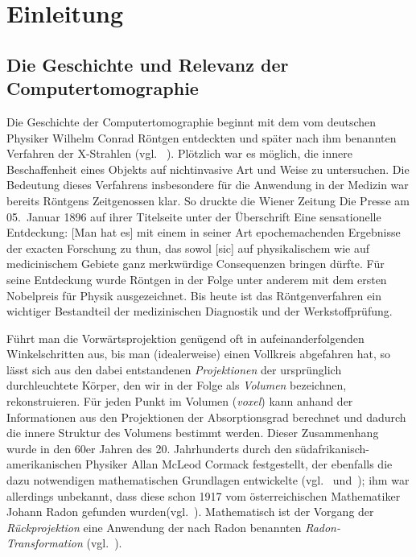 \chapter{Einleitung}

\section{Die Geschichte und Relevanz der Computertomographie}

Die Geschichte der Computertomographie beginnt mit dem vom deutschen Physiker Wilhelm Conrad Röntgen entdeckten
und später nach ihm benannten Verfahren der {\glqq}X-Strahlen{\grqq} (vgl. ~\cite{roentgen}). Plötzlich war es möglich,
die innere Beschaffenheit eines Objekts auf nichtinvasive Art und Weise zu untersuchen. Die Bedeutung dieses Verfahrens
insbesondere für die Anwendung in der Medizin war bereits Röntgens Zeitgenossen klar. So druckte die Wiener Zeitung
{\glqq}Die Presse{\grqq} am 05.\ Januar 1896 auf ihrer Titelseite unter der Überschrift {\glqq}Eine sensationelle
Entdeckung{\grqq}: {\glqq}[Man hat es] mit einem in seiner Art epochemachenden Ergebnisse der exacten Forschung zu thun,
das sowol [sic] auf physikalischem wie auf medicinischem Gebiete ganz merkwürdige Consequenzen bringen dürfte.{\grqq}
Für seine Entdeckung wurde Röntgen in der Folge unter anderem mit dem ersten Nobelpreis für Physik ausgezeichnet. Bis
heute ist das Röntgenverfahren ein wichtiger Bestandteil der medizinischen Diagnostik und der Werkstoffprüfung.

Führt man die Vorwärtsprojektion genügend oft in aufeinanderfolgenden Winkelschritten aus, bis man (idealerweise) einen
Vollkreis abgefahren hat, so lässt sich aus den dabei entstandenen \textit{Projektionen} der ursprünglich durchleuchtete
Körper, den wir in der Folge als \textit{Volumen} bezeichnen, rekonstruieren. Für jeden Punkt im Volumen
(\textit{\gls{voxel}}) kann anhand der Informationen aus den Projektionen der Absorptionsgrad berechnet und dadurch die
innere Struktur des Volumens bestimmt werden. Dieser Zusammenhang wurde in den 60er Jahren des 20. Jahrhunderts durch
den südafrikanisch-amerikanischen Physiker Allan McLeod Cormack festgestellt, der ebenfalls die dazu notwendigen
mathematischen Grundlagen entwickelte (vgl.~\cite{cormack63} und~\cite{cormack64}); ihm war allerdings unbekannt, dass
diese schon 1917 vom österreichischen Mathematiker Johann Radon gefunden wurden(vgl.~\cite{cormack79}). Mathematisch ist
der Vorgang der \textit{Rückprojektion} eine Anwendung der nach Radon benannten \textit{Radon-Transformation}
(vgl.~\cite{radon}).

